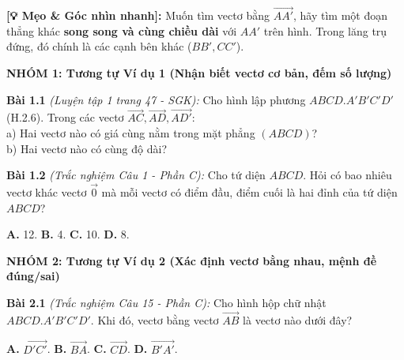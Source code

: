 \documentclass[12pt,a4paper]{article}
\begin{document}
\begin{tcolorbox}[colback=white!95!black, colframe=myred, title=\textbf{KHỐI 4: CÁC VÍ DỤ MINH HỌA MẪU (Phủ hết các biến thể)}]
    \noindent\textbf{[💡 Mẹo \& Góc nhìn nhanh]:} Muốn tìm vectơ bằng \(\overrightarrow{AA'}\), hãy tìm một đoạn thẳng khác \textbf{song song và cùng chiều dài} với \(AA'\) trên hình. Trong lăng trụ đứng, đó chính là các cạnh bên khác (\(BB', CC'\)).
\end{tcolorbox}

\begin{tcolorbox}[colback=white, colframe=black, title=\textbf{KHỐI 5: BÀI TẬP RÈN LUYỆN TƯƠNG TỰ (Lặp đi lặp lại để khắc sâu)}]
    
    \textbf{NHÓM 1: Tương tự Ví dụ 1 (Nhận biết vectơ cơ bản, đếm số lượng)}
    
    \textbf{Bài 1.1} \textit{(Luyện tập 1 trang 47 - SGK):} Cho hình lập phương \(ABCD.A'B'C'D'\) (H.2.6). Trong các vectơ \(\overrightarrow{AC}, \overrightarrow{AD}, \overrightarrow{AD'}\): \\
    a) Hai vectơ nào có giá cùng nằm trong mặt phẳng \((ABCD)\)? \\
    b) Hai vectơ nào có cùng độ dài?
    
    \textbf{Bài 1.2} \textit{(Trắc nghiệm Câu 1 - Phần C):} Cho tứ diện \(ABCD\). Hỏi có bao nhiêu vectơ khác vectơ \(\vec{0}\) mà mỗi vectơ có điểm đầu, điểm cuối là hai đỉnh của tứ diện \(ABCD\)?
    \begin{tcolorbox}[colback=white, colframe=white, top=0pt, bottom=0pt, left=0pt]
        \textbf{A.} 12. \hfill \textbf{B.} 4. \hfill \textbf{C.} 10. \hfill \textbf{D.} 8.
    \end{tcolorbox}
    
    \vspace{0.3cm}
    \textbf{NHÓM 2: Tương tự Ví dụ 2 (Xác định vectơ bằng nhau, mệnh đề đúng/sai)}
    
    \textbf{Bài 2.1} \textit{(Trắc nghiệm Câu 15 - Phần C):} Cho hình hộp chữ nhật \(ABCD.A'B'C'D'\). Khi đó, vectơ bằng vectơ \(\overrightarrow{AB}\) là vectơ nào dưới đây?
    \begin{tcolorbox}[colback=white, colframe=white, top=0pt, bottom=0pt, left=0pt]
        \textbf{A.} \(\overrightarrow{D'C'}\). \hfill \textbf{B.} \(\overrightarrow{BA}\). \hfill \textbf{C.} \(\overrightarrow{CD}\). \hfill \textbf{D.} \(\overrightarrow{B'A'}\).
    \end{tcolorbox}
    

\end{tcolorbox}
\end{document}
